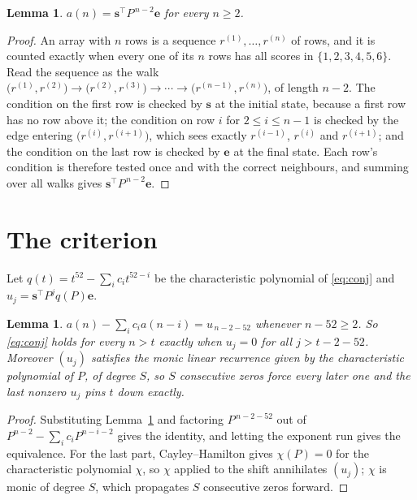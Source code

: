 \documentclass[11pt,a4paper]{article}
\theoremstyle{plain}
\newtheorem{lemma}[theorem]{Lemma}
\theoremstyle{definition}
\begin{document}
\begin{lemma}\label{lem:walk}
$a(n)=\mathbf{s}^{\!\top}P^{\,n-2}\mathbf{e}$ for every $n\ge2$.
\end{lemma}

\begin{proof}
An array with $n$ rows is a sequence $r^{(1)},\dots,r^{(n)}$ of rows, and it is counted
exactly when every one of its $n$ rows has all scores in $\{1,2,3,4,5,6\}$. Read the sequence as the
walk $\bigl(r^{(1)},r^{(2)}\bigr)\to\bigl(r^{(2)},r^{(3)}\bigr)\to\cdots\to
\bigl(r^{(n-1)},r^{(n)}\bigr)$, of length $n-2$. The condition on the first row is
checked by $\mathbf{s}$ at the initial state, because a first row has no row above it; the
condition on row $i$ for $2\le i\le n-1$ is checked by the edge entering
$\bigl(r^{(i)},r^{(i+1)}\bigr)$, which sees exactly $r^{(i-1)}$, $r^{(i)}$ and
$r^{(i+1)}$; and the condition on the last row is checked by $\mathbf{e}$ at the final
state. Each row's condition is therefore tested once and with the correct neighbours, and
summing over all walks gives $\mathbf{s}^{\!\top}P^{\,n-2}\mathbf{e}$.
\end{proof}

\section{The criterion}

Let $q(t)=t^{52}-\sum_i c_i t^{52-i}$ be the characteristic polynomial of
\eqref{eq:conj} and $u_j=\mathbf{s}^{\!\top}P^{j}q(P)\mathbf{e}$.

\begin{lemma}\label{lem:crit}
$a(n)-\sum_i c_i a(n-i)=u_{\,n-2-52}$ whenever $n-52\ge2$. So \eqref{eq:conj}
holds for every $n>t$ exactly when $u_j=0$ for all $j>t-2-52$. Moreover $(u_j)$
satisfies the monic linear recurrence given by the characteristic polynomial of $P$, of
degree $S$, so $S$ consecutive zeros force every later one and the last nonzero $u_j$ pins
$t$ down exactly.
\end{lemma}

\begin{proof}
Substituting Lemma~\ref{lem:walk} and factoring $P^{\,n-2-52}$ out of
$P^{n-2}-\sum_i c_i P^{n-i-2}$ gives the identity, and letting the exponent run gives the
equivalence. For the last part, Cayley--Hamilton gives $\chi(P)=0$ for the characteristic
polynomial $\chi$, so $\chi$ applied to the shift annihilates $(u_j)$; $\chi$ is monic of
degree $S$, which propagates $S$ consecutive zeros forward.
\end{proof}
\end{document}
